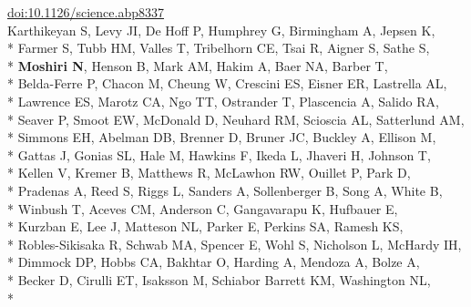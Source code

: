 \documentclass[margin,line]{res}
\begin{document}
\begin{resume}
\hspace*{8mm} \href{https://doi.org/10.1126/science.abp8337}{doi:10.1126/science.abp8337}\\
\hspace*{4mm} Karthikeyan S, Levy JI, De Hoff P, Humphrey G, Birmingham A, Jepsen K,\\*
\hspace*{9.5mm} Farmer S, Tubb HM, Valles T, Tribelhorn CE, Tsai R, Aigner S, Sathe S,\\*
\hspace*{9.5mm} \textbf{Moshiri N}, Henson B, Mark AM, Hakim A, Baer NA, Barber T,\\*
\hspace*{9.5mm} Belda-Ferre P, Chacon M, Cheung W, Crescini ES, Eisner ER, Lastrella AL,\\*
\hspace*{9.5mm} Lawrence ES, Marotz CA, Ngo TT, Ostrander T, Plascencia A, Salido RA,\\*
\hspace*{9.5mm} Seaver P, Smoot EW, McDonald D, Neuhard RM, Scioscia AL, Satterlund AM,\\*
\hspace*{9.5mm} Simmons EH, Abelman DB, Brenner D, Bruner JC, Buckley A, Ellison M,\\*
\hspace*{9.5mm} Gattas J, Gonias SL, Hale M, Hawkins F, Ikeda L, Jhaveri H, Johnson T,\\*
\hspace*{9.5mm} Kellen V, Kremer B, Matthews R, McLawhon RW, Ouillet P, Park D,\\*
\hspace*{9.5mm} Pradenas A, Reed S, Riggs L, Sanders A, Sollenberger B, Song A, White B,\\*
\hspace*{9.5mm} Winbush T, Aceves CM, Anderson C, Gangavarapu K, Hufbauer E,\\*
\hspace*{9.5mm} Kurzban E, Lee J, Matteson NL, Parker E, Perkins SA, Ramesh KS,\\*
\hspace*{9.5mm} Robles-Sikisaka R, Schwab MA, Spencer E, Wohl S, Nicholson L, McHardy IH,\\*
\hspace*{9.5mm} Dimmock DP, Hobbs CA, Bakhtar O, Harding A, Mendoza A, Bolze A,\\*
\hspace*{9.5mm} Becker D, Cirulli ET, Isaksson M, Schiabor Barrett KM, Washington NL,\\*

\end{resume}
\end{document}
